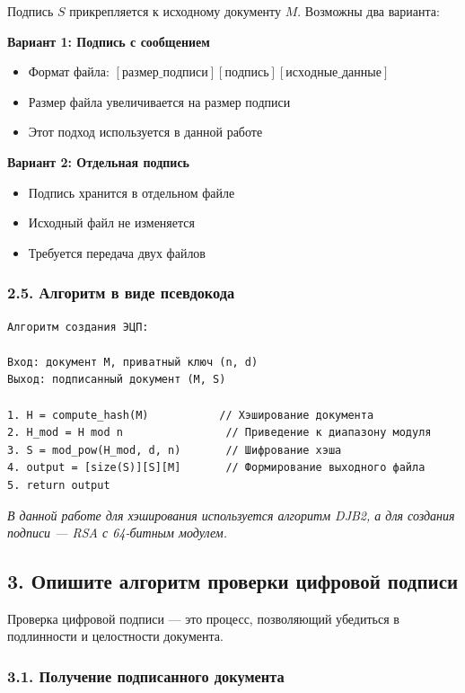 Подпись $S$ прикрепляется к исходному документу $M$. Возможны два варианта:

\textbf{Вариант 1: Подпись с сообщением}
\begin{itemize}
    \item Формат файла: $[размер\_подписи][подпись][исходные\_данные]$
    \item Размер файла увеличивается на размер подписи
    \item Этот подход используется в данной работе
\end{itemize}

\textbf{Вариант 2: Отдельная подпись}
\begin{itemize}
    \item Подпись хранится в отдельном файле
    \item Исходный файл не изменяется
    \item Требуется передача двух файлов
\end{itemize}

\subsubsection*{2.5. Алгоритм в виде псевдокода}

\begin{verbatim}
Алгоритм создания ЭЦП:

Вход: документ M, приватный ключ (n, d)
Выход: подписанный документ (M, S)

1. H = compute_hash(M)           // Хэширование документа
2. H_mod = H mod n                // Приведение к диапазону модуля
3. S = mod_pow(H_mod, d, n)       // Шифрование хэша
4. output = [size(S)][S][M]       // Формирование выходного файла
5. return output
\end{verbatim}

\textit{В данной работе для хэширования используется алгоритм DJB2, а для создания подписи — RSA с 64-битным модулем.}

\subsection*{3. Опишите алгоритм проверки цифровой подписи}

Проверка цифровой подписи — это процесс, позволяющий убедиться в подлинности и целостности документа.

\subsubsection*{3.1. Получение подписанного документа}

